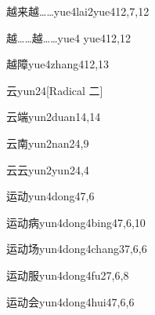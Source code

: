\begin{verbete}{越来越……}{yue4lai2yue4}{12,7,12}
\end{verbete}

\begin{verbete}{越……越……}{yue4 yue4}{12,12}
\end{verbete}

\begin{verbete}{越障}{yue4zhang4}{12,13}
\end{verbete}

\begin{verbete}{云}{yun2}{4}[Radical 二]
\end{verbete}

\begin{verbete}{云端}{yun2duan1}{4,14}
\end{verbete}

\begin{verbete}{云南}{yun2nan2}{4,9}
\end{verbete}

\begin{verbete}{云云}{yun2yun2}{4,4}
\end{verbete}

\begin{verbete}{运动}{yun4dong4}{7,6}
\end{verbete}

\begin{verbete}{运动病}{yun4dong4bing4}{7,6,10}
\end{verbete}

\begin{verbete}{运动场}{yun4dong4chang3}{7,6,6}
\end{verbete}

\begin{verbete}{运动服}{yun4dong4fu2}{7,6,8}
\end{verbete}

\begin{verbete}{运动会}{yun4dong4hui4}{7,6,6}
\end{verbete}

